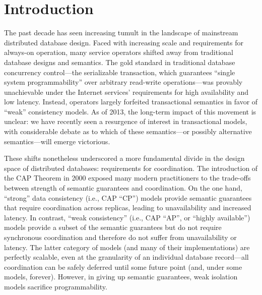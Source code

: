 
\section{Introduction}
\label{sec:intro}

The past decade has seen increasing tumult in the landscape of
mainstream distributed database design.  Faced with increasing scale
and requirements for always-on operation, many service operators
shifted away from traditional database designs and semantics. The gold
standard in traditional database concurrency control---the
serializable transaction, which guarantees ``single system
programmability'' over arbitrary read-write operations---was provably
unachievable under the Internet services' requirements for high
availability and low latency. Instead, operators largely forfeited
transactional semantics in favor of ``weak'' consistency models. As of
2013, the long-term impact of this movement is unclear: we have
recently seen a resurgence of interest in transactional models, with
considerable debate as to which of these semantics---or possibly
alternative semantics---will emerge victorious.

These shifts nonetheless underscored a more fundamental divide in the
design space of distributed databases: requirements for
coordination. The introduction of the CAP Theorem in 2000 exposed many
modern practitioners to the trade-offs between strength of semantic
guarantees and coordination. On the one hand, ``strong'' data
consistency (i.e., CAP ``CP'') models provide semantic guarantees that
require coordination across replicas, leading to unavailability and
increased latency. In contrast, ``weak consistency'' (i.e., CAP
``AP'', or ``highly available'') models provide a subset of the
semantic guarantees but do not require synchronous coordination and
therefore do not suffer from unavailability or latency. The latter
category of models (and many of their implementations) are perfectly
scalable, even at the granularity of an individual database
record---all coordination can be safely deferred until some future
point (and, under some models, forever). However, in giving up
semantic guarantees, weak isolation models sacrifice programmability.

